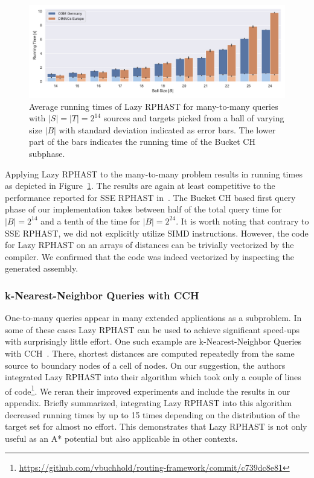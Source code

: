 \documentclass[manuscript,review]{acmart}
\begin{document}
\begin{figure}
\centering
\includegraphics[width=\linewidth]{fig/lazy_rphast_many_to_many.pdf}
\caption{
Average running times of Lazy RPHAST for many-to-many queries with $|S| = |T| = 2^{14}$ sources and targets picked from a ball of varying size $|B|$ with standard deviation indicated as error bars.
The lower part of the bars indicates the running time of the Bucket CH subphase.
}\label{fig:many_to_many}
\end{figure}

Applying Lazy RPHAST to the many-to-many problem results in running times as depicted in Figure~\ref{fig:many_to_many}.
The results are again at least competitive to the performance reported for SSE RPHAST in~\cite{delling_et_al:OASIcs:2011:3266}.
The Bucket CH based first query phase of our implementation takes between half of the total query time for $|B| = 2^{14}$ and a tenth of the time for $|B| = 2^{24}$.
It is worth noting that contrary to SSE RPHAST, we did not explicitly utilize SIMD instructions.
However, the code for Lazy RPHAST on an arrays of distances can be trivially vectorized by the compiler.
We confirmed that the code was indeed vectorized by inspecting the generated assembly.

\subsubsection{k-Nearest-Neighbor Queries with CCH}

One-to-many queries appear in many extended applications as a subproblem.
In some of these cases Lazy RPHAST can be used to achieve significant speed-ups with surprisingly little effort.
One such example are k-Nearest-Neighbor Queries with CCH~\cite{buchhold_et_al:LIPIcs.SEA.2021.18}.
There, shortest distances are computed repeatedly from the same source to boundary nodes of a cell of nodes.
On our suggestion, the authors integrated Lazy RPHAST into their algorithm which took only a couple of lines of code\footnote{\url{https://github.com/vbuchhold/routing-framework/commit/c739dc8e81}}.
We reran their improved experiments and include the results in our appendix.
Briefly summarized, integrating Lazy RPHAST into this algorithm decreased running times by up to 15 times depending on the distribution of the target set for almost no effort.
This demonstrates that Lazy RPHAST is not only useful as an A* potential but also applicable in other contexts.
\end{document}
